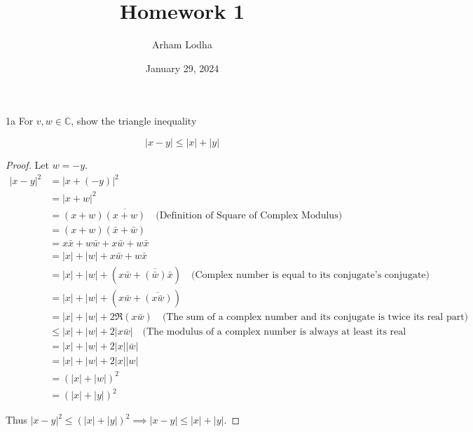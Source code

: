 \documentclass{article}
\newcommand{\C}{\mathbb{C}}
\begin{document}
\title{Homework 1}
\author{Arham Lodha}%
\date{January 29, 2024}%
\maketitle


\begin{PROB}{1a}\label{Problem 1a.}
    For $v, w \in \C$, show the triangle inequality

    \[| x - y | \leq |x| + |y| \]
\end{PROB}
\begin{proof}
    Let $w = -y$.
    \begin{align*}
        |x - y|^2 &= |x + (-y)|^2 \\ 
        &= |x + w|^2 \\
        &= (x + w)\overline{(x + w)} \quad \text{(Definition of Square of Complex Modulus)} \\
        &= (x + w)(\bar{x} + \bar{w}) \\
        &= x \bar{x} + w \bar{w} + x\bar{w} + w\bar{x} \\
        &= |x| + |w| + x\bar{w} + w\bar{x} \\
        &= |x| + |w| + (x\bar{w} + \overline{(\bar{w})}\bar{x}) \quad \text{(Complex number is equal to its conjugate's conjugate)}\\
        &= |x| + |w| + (x\bar{w} + \overline{(x\bar{w})}) \\
        &= |x| + |w| + 2\Re(x\bar{w}) \quad \text{(The sum of a complex number and its conjugate is twice its real part)}\\
        &\leq |x| + |w| + 2|x \bar{w}| \quad \text{(The modulus of a complex number is always at least its real component)} \\
        &= |x| + |w| + 2|x||\bar{w}| \\
        &= |x| + |w| + 2|x||w| \\
        &= (|x| + |w|)^2 \\
        &= (|x| + |y|)^2
    \end{align*}

    Thus $|x - y|^2 \leq (|x| + |y|)^2 \implies |x - y| \leq |x| + |y|$.  
\end{proof}

\bigskip
\end{document}
